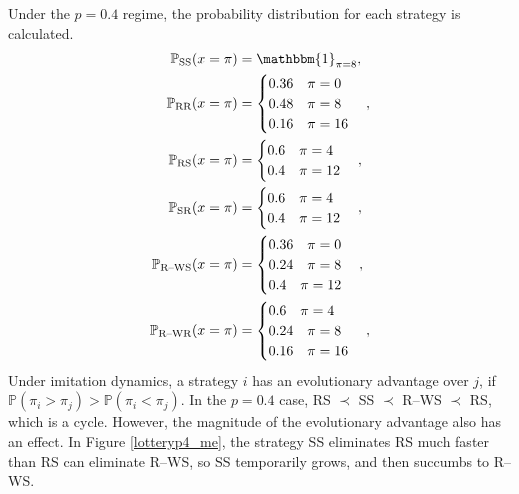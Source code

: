 Under the $p=0.4$ regime, the probability distribution for each strategy is calculated. \\
 \begin{align*}
 \mathbb P_{\text{SS}}(x = \pi)  &= \mathbbm{1}_{\pi = 8}, \\
 \mathbb P_{\text{RR}}(x = \pi)  &= \begin{cases} 0.36 \quad \pi = 0 \\
    0.48 \quad \pi =8 \\ 0.16 \quad \pi = 16
    \end{cases}, \\
    \mathbb P_{\text{RS}}(x = \pi)  &= \begin{cases} 0.6 \quad \pi =4  \\
     0.4 \quad \pi = 12
    \end{cases}, \\
    \mathbb P_{\text{SR}}(x = \pi)  &= \begin{cases} 0.6 \quad \pi =4  \\
     0.4 \quad \pi = 12
    \end{cases}, \\
        \mathbb P_{\text{R--WS}}(x = \pi)  &= \begin{cases} 0.36 \quad \pi = 0 \\
    0.24 \quad \pi =8 \\
    0.4 \quad \pi = 12\\
    \end{cases}, \\
    \mathbb P_{\text{R--WR}}(x = \pi)  &= \begin{cases} 0.6 \quad \pi = 4 \\
    0.24 \quad \pi =8 \\
    0.16 \quad \pi = 16\\
    \end{cases}, \\
\end{align*}
Under imitation dynamics, a strategy $i$ has an evolutionary advantage over $j$, if $\mathbb P(\pi_i > \pi_j) > \mathbb P(\pi_i < \pi_j)$. In the $p=0.4$ case, RS $\prec$ SS $\prec$ R--WS $\prec$ RS, which is a cycle. However, the magnitude of the evolutionary advantage also has an effect. In Figure \ref{lotteryp4_me}, the strategy SS eliminates RS much faster than RS can eliminate R--WS, so SS temporarily grows, and then succumbs to R--WS. \\

